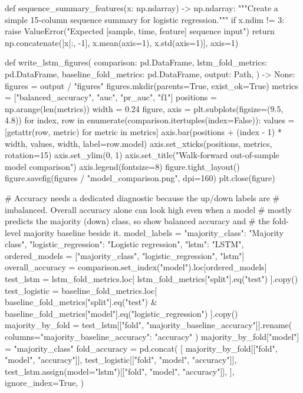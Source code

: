 \documentclass[UTF8,a4paper,fontset=fandol]{ctexart}
\begin{document}
\begin{ProjectCode}
def sequence_summary_features(x: np.ndarray) -> np.ndarray:
    """Create a simple 15-column sequence summary for logistic regression."""
    if x.ndim != 3:
        raise ValueError("Expected [sample, time, feature] sequence input")
    return np.concatenate([x[:, -1], x.mean(axis=1), x.std(axis=1)], axis=1)


def write_lstm_figures(
    comparison: pd.DataFrame,
    lstm_fold_metrics: pd.DataFrame,
    baseline_fold_metrics: pd.DataFrame,
    output: Path,
) -> None:
    figures = output / "figures"
    figures.mkdir(parents=True, exist_ok=True)
    metrics = ["balanced_accuracy", "auc", "pr_auc", "f1"]
    positions = np.arange(len(metrics))
    width = 0.24
    figure, axis = plt.subplots(figsize=(9.5, 4.8))
    for index, row in enumerate(comparison.itertuples(index=False)):
        values = [getattr(row, metric) for metric in metrics]
        axis.bar(positions + (index - 1) * width, values, width, label=row.model)
    axis.set_xticks(positions, metrics, rotation=15)
    axis.set_ylim(0, 1)
    axis.set_title("Walk-forward out-of-sample model comparison")
    axis.legend(fontsize=8)
    figure.tight_layout()
    figure.savefig(figures / "model_comparison.png", dpi=160)
    plt.close(figure)

    # Accuracy needs a dedicated diagnostic because the up/down labels are
    # imbalanced.  Overall accuracy alone can look high even when a model
    # mostly predicts the majority (down) class, so show balanced accuracy and
    # the fold-level majority baseline beside it.
    model_labels = {
        "majority_class": "Majority class",
        "logistic_regression": "Logistic regression",
        "lstm": "LSTM",
    }
    ordered_models = ["majority_class", "logistic_regression", "lstm"]
    overall_accuracy = comparison.set_index("model").loc[ordered_models]
    test_lstm = lstm_fold_metrics.loc[
        lstm_fold_metrics["split"].eq("test")
    ].copy()
    test_logistic = baseline_fold_metrics.loc[
        baseline_fold_metrics["split"].eq("test")
        & baseline_fold_metrics["model"].eq("logistic_regression")
    ].copy()
    majority_by_fold = test_lstm[["fold", "majority_baseline_accuracy"]].rename(
        columns={"majority_baseline_accuracy": "accuracy"}
    )
    majority_by_fold["model"] = "majority_class"
    fold_accuracy = pd.concat(
        [
            majority_by_fold[["fold", "model", "accuracy"]],
            test_logistic[["fold", "model", "accuracy"]],
            test_lstm.assign(model="lstm")[["fold", "model", "accuracy"]],
        ],
        ignore_index=True,
    )


\end{ProjectCode}
\end{document}
